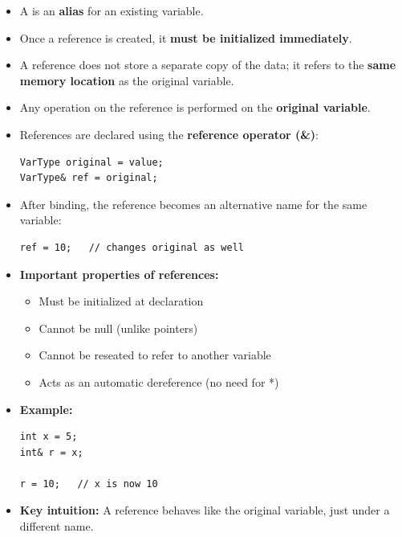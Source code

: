 \documentclass[10pt]{article}
\newcommand{\pbreak}{\vspace{30pt}}
\newcommand{\vocab}[1]{\fbox{\textbf{\textit{#1}}}}
\begin{document}
\begin{itemize}
    \item A \vocab{reference} is an \textbf{alias} for an existing variable.
    \item Once a reference is created, it \textbf{must be initialized immediately}.
    \item A reference does not store a separate copy of the data; it refers to the \textbf{same memory location} as the original variable.
    \item Any operation on the reference is performed on the \textbf{original variable}.

    \pbreak

    \item References are declared using the \textbf{reference operator (\&)}:
    \begin{verbatim}
VarType original = value;
VarType& ref = original;
    \end{verbatim}

    \item After binding, the reference becomes an alternative name for the same variable:
    \begin{verbatim}
ref = 10;   // changes original as well
    \end{verbatim}

    \pbreak

    \item \textbf{Important properties of references:}
    \begin{itemize}
        \item Must be initialized at declaration
        \item Cannot be null (unlike pointers)
        \item Cannot be reseated to refer to another variable
        \item Acts as an automatic dereference (no need for *)
    \end{itemize}

    \pbreak

    \item \textbf{Example:}
    \begin{verbatim}
int x = 5;
int& r = x;

r = 10;   // x is now 10
    \end{verbatim}

    \item \textbf{Key intuition:}
    A reference behaves like the original variable, just under a different name.
\end{itemize}
\end{document}
